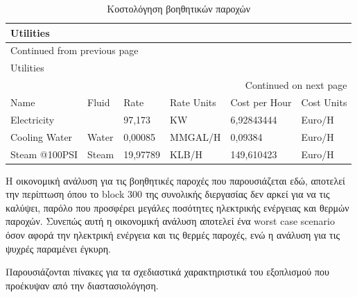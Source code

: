 \documentclass[11pt]{article}
\begin{document}
\begin{longtable}{llllll}
\caption{Κοστολόγηση βοηθητικών παροχών}
\\
Utilities &  &  &  &  & \\
\hline
\endfirsthead
\multicolumn{6}{l}{Continued from previous page} \\
\hline

Utilities &  &  &  &  &  \\

\hline
\endhead
\hline\multicolumn{6}{r}{Continued on next page} \\
\endfoot
\endlastfoot
\hline
Name & Fluid & Rate & Rate Units & Cost per Hour & Cost Units\\
Electricity &  & 97,173 & KW & 6,92843444 & Euro/H\\
Cooling Water & Water & 0,00085 & MMGAL/H & 0,09384 & Euro/H\\
Steam @100PSI & Steam & 19,97789 & KLB/H & 149,610423 & Euro/H\\
\end{longtable}

Η οικονομική ανάλυση για τις βοηθητικές παροχές που παρουσιάζεται εδώ,
αποτελεί την περίπτωση όπου το block 300 της συνολικής διεργασίας δεν αρκεί για να τις
καλύψει, παρόλο που προσφέρει μεγάλες ποσότητες ηλεκτρικής ενέργειας
και θερμών παροχών. Συνεπώς αυτή η οικονομική ανάλυση αποτελεί ένα worst
case scenario όσον αφορά την ηλεκτρική ενέργεια και τις θερμές παροχές,
ενώ η ανάλυση για τις ψυχρές παραμένει έγκυρη.

Παρουσιάζονται πίνακες για τα σχεδιαστικά χαρακτηριστικά του εξοπλισμού
που προέκυψαν από την διαστασιολόγηση.
\end{document}
